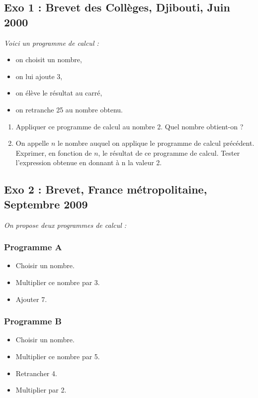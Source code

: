 \documentclass[10pt]{article}
\begin{document}
\subsection*{Exo 1 : Brevet des Collèges, Djibouti, Juin 2000}
\begin{multicols}{2}
	\textit{Voici un programme de calcul :}
	\begin{itemize}
		\item  on choisit un nombre,
		\item on lui ajoute 3,
		\item on élève le résultat au carré,
		\item on retranche 25 au nombre obtenu.
	\end{itemize}
	
	\begin{enumerate}
		\item Appliquer ce programme de calcul au nombre 2.
		Quel nombre obtient-on ?
		\item On appelle $n$ le nombre auquel on applique le programme de calcul précédent.
		Exprimer, en fonction de $n$, le résultat de ce programme de calcul.
		Tester l'expression obtenue en donnant à n la valeur 2.
	\end{enumerate}
\end{multicols}

\subsection*{Exo 2 : Brevet, France métropolitaine, Septembre 2009}

\begin{multicols}{2}
	\textit{On propose deux programmes de calcul :}
	\subsubsection*{Programme A}
		\begin{itemize}
			\item Choisir un nombre.
			\item Multiplier ce nombre par 3.
			\item Ajouter 7.
		\end{itemize}

	\subsubsection*{Programme B}
		\begin{itemize}
			\item Choisir un nombre.
			\item Multiplier ce nombre par 5.
			\item Retrancher 4.
			\item Multiplier par 2.
		\end{itemize}
\end{multicols}
\end{document}
